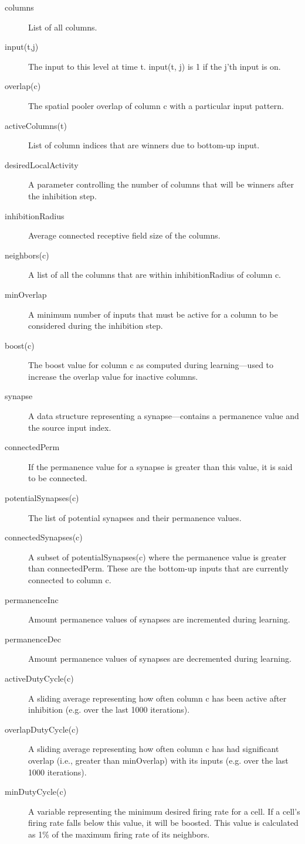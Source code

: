 \documentclass{report}
\begin{document}
\begin{description}
\item[columns] List of all columns.
\item[input(t,j)] The input to this level at time t. input(t, j) is 1
  if the j'th input is on.
\item[overlap(c)] The spatial pooler overlap of column c with a
  particular input pattern.
\item[activeColumns(t)] List of column indices that are winners due to
  bottom-up input.
\item[desiredLocalActivity] A parameter controlling the number of
  columns that will be winners after the inhibition step.
\item[inhibitionRadius] Average connected receptive field size of the
  columns.
\item[neighbors(c)] A list of all the columns that are within
  inhibitionRadius of column c.
\item[minOverlap] A minimum number of inputs that must be active for a
  column to be considered during the inhibition step.
\item[boost(c)] The boost value for column c as computed during
  learning---used to increase the overlap value for inactive columns.
\item[synapse] A data structure representing a synapse---contains a
  permanence value and the source input index.
\item[connectedPerm] If the permanence value for a synapse is greater
  than this value, it is said to be connected.
\item[potentialSynapses(c)] The list of potential synapses and their
  permanence values.
\item[connectedSynapses(c)] A subset of potentialSynapses(c) where the
  permanence value is greater than connectedPerm. These are the
  bottom-up inputs that are currently connected to column c.
\item[permanenceInc] Amount permanence values of synapses are
  incremented during learning.
\item[permanenceDec] Amount permanence values of synapses are
  decremented during learning.
\item[activeDutyCycle(c)] A sliding average representing how often
  column c has been active after inhibition (e.g. over the last 1000
  iterations).
\item[overlapDutyCycle(c)] A sliding average representing how often
  column c has had significant overlap (i.e., greater than minOverlap)
  with its inputs (e.g. over the last 1000 iterations).
\item[minDutyCycle(c)] A variable representing the minimum desired
  firing rate for a cell. If a cell's firing rate falls below this
  value, it will be boosted. This value is calculated as 1\% of the
  maximum firing rate of its neighbors.
\end{description}
\end{document}

